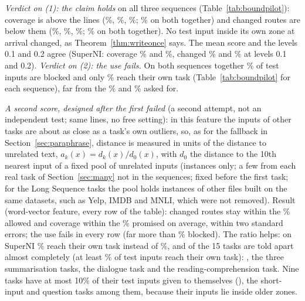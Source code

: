 \emph{Verdict on (1): the claim holds} on all three sequences (Table~\ref{tab:boundpilot}): coverage is above the lines (\BoundSuperniCovLimit{}\%, \BoundLongCovLimit{}\%, \BoundBothCovLimit{}\%; \BoundBothWordKnnFiveCov{}\% on both together) and changed routes are below them (\BoundSuperniChangedLimit{}\%, \BoundLongChangedLimit{}\%, \BoundBothChangedLimit{}\%; \BoundBothWordKnnFiveChanged{}\% on both together). No test input inside its own zone at arrival changed, as Theorem~\ref{thm:writeonce} says. The mean score and the levels 0.1 and 0.2 agree (SuperNI: coverage \BoundSuperniWordKnnTenCov{}\% and \BoundSuperniWordKnnTwentyCov{}\%, changed \BoundSuperniWordKnnTenChanged{}\% and \BoundSuperniWordKnnTwentyChanged{}\% at levels 0.1 and 0.2).
\emph{Verdict on (2): the use fails.} On both sequences together \BoundBothWordKnnFiveBlocked{}\% of test inputs are blocked and only \BoundBothWordKnnFiveOwn{}\% reach their own task (Table~\ref{tab:boundpilot} for each sequence), far from the \BoundLineOwn{}\% and \BoundLineBlock{}\% asked for.

\emph{A second score, designed after the first failed} (a second attempt, not an independent test; same lines, no free setting): in this feature the inputs of other tasks are about as close as a task's own outliers, so, as for the fallback in Section~\ref{sec:paraphrase}, distance is measured in units of the distance to unrelated text, $a_k(x) = d_k(x) / d_0(x)$, with $d_0$ the distance to the 10th nearest input of a fixed pool of \BoundPool{} unrelated inputs (instances only; a few from each real task of Section~\ref{sec:many} not in the sequences; fixed before the first task; for the Long Sequence tasks the pool holds instances of other files built on the same datasets, such as Yelp, IMDB and MNLI, which were not removed).
Result (word-vector feature, every row of the table): changed routes stay within the \BoundAlpha{}\% allowed and coverage within the \BoundCovPromised{}\% promised on average, within two standard errors; the use fails in every row (far more than \BoundLineNotBlock{}\% blocked). The ratio helps: on SuperNI \BoundSuperniWordRatioFiveOwn{}\% reach their own task instead of \BoundSuperniWordKnnFiveOwn{}\%, and \BoundToldApartCount{} of the 15 tasks are told apart almost completely (at least \BoundToldApartMin{}\% of test inputs reach their own task): \texttt{\BoundToldApartNames{}}, the three summarisation tasks, the dialogue task and the reading-comprehension task. Nine tasks have at most 10\% of their test inputs given to themselves (\BoundNotApartNames{}), the short-input and question tasks among them, because their inputs lie inside older zones. 

